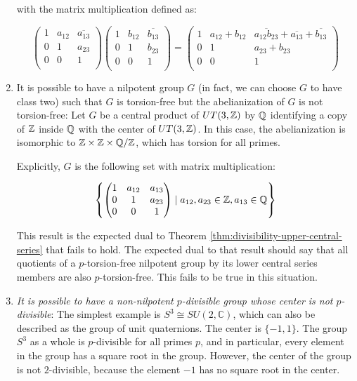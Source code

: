 \begin{enumerate}
  with the matrix multiplication defined as:

  $$\begin{pmatrix} 1 & a_{12} & \overline{a_{13}} \\ 0 & 1 & a_{23} \\ 0 & 0 & 1 \\\end{pmatrix}\begin{pmatrix} 1 & b_{12} & \overline{b_{13}} \\ 0 & 1 & b_{23} \\ 0 & 0 & 1 \\\end{pmatrix} = \begin{pmatrix} 1 & a_{12} + b_{12} & \overline{a_{12}b_{23}} + \overline{a_{13}} + \overline{b_{13}} \\ 0 & 1 & a_{23} + b_{23} \\ 0 & 0 & 1 \\\end{pmatrix}$$

\item It is possible to have a nilpotent group $G$ (in fact, we can
  choose $G$ to have class two) such that $G$ is torsion-free but the
  abelianization of $G$ is not torsion-free: Let $G$ be a central
  product of $UT(3,\mathbb{Z})$ by $\mathbb{Q}$ identifying a copy of $\mathbb{Z}$ inside $\mathbb{Q}$
  with the center of $UT(3,\mathbb{Z})$. In this case, the abelianization is
  isomorphic to $\mathbb{Z} \times \mathbb{Z} \times \mathbb{Q}/\mathbb{Z}$, which has torsion for all
  primes.

  Explicitly, $G$ is the following set with matrix multiplication:

  $$\left \{\begin{pmatrix}
1 & a_{12} & a_{13} \\
0 & 1 & a_{23}\\
0 & 0 & 1\end{pmatrix} \mid a_{12},a_{23} \in \mathbb{Z}, a_{13} \in \mathbb{Q} \right \}$$

  This result is the expected dual to Theorem
  \ref{thm:divisibility-upper-central-series} that fails to hold. The
  expected dual to that result should say that all quotients of a
  $p$-torsion-free nilpotent group by its lower central series members
  are also $p$-torsion-free. This fails to be true in this situation.
\item {\em It is possible to have a non-nilpotent $p$-divisible group
  whose center is not $p$-divisible}: The simplest example is $S^3
  \cong SU(2,\mathbb{C})$, which can also be described as the group of
  unit quaternions. The center is $\{-1,1\}$. The group $S^3$ as a
  whole is $p$-divisible for all primes $p$, and in particular, every
  element in the group has a square root in the group. However, the
  center of the group is not $2$-divisible, because the element $-1$
  has no square root in the center.


\end{enumerate}
